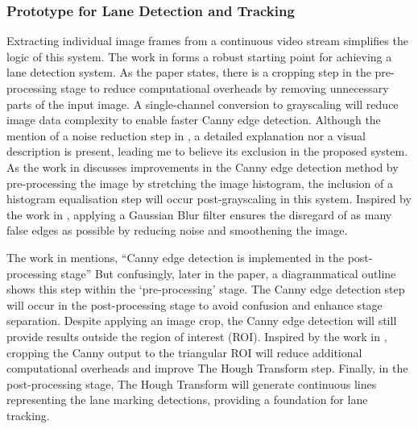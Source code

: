\documentclass[9pt,conference]{IEEEtran}
\begin{document}
\subsubsection{Prototype for Lane Detection and Tracking}

Extracting individual image frames from a continuous video stream simplifies the logic of this system. The work in \cite{b3} forms a robust starting point for achieving a lane detection system. As the paper states, there is a cropping step in the pre-processing stage to reduce computational overheads by removing unnecessary parts of the input image. A single-channel conversion to grayscaling will reduce image data complexity to enable faster Canny edge detection. Although the mention of a noise reduction step in \cite{b3}, a detailed explanation nor a visual description is present, leading me to believe its exclusion in the proposed system. As the work in \cite{b7} discusses improvements in the Canny edge detection method by pre-processing the image by stretching the image histogram, the inclusion of a histogram equalisation step will occur post-grayscaling in this system. Inspired by the work in \cite{b6}, applying a Gaussian Blur filter ensures the disregard of as many false edges as possible by reducing noise and smoothening the image.

The work in \cite{b3} mentions, ``Canny edge detection is implemented in the post-processing stage'' But confusingly, later in the paper, a diagrammatical outline shows this step within the `pre-processing' stage. The Canny edge detection step will occur in the post-processing stage to avoid confusion and enhance stage separation. Despite applying an image crop, the Canny edge detection will still provide results outside the region of interest (ROI). Inspired by the work in \cite{b6}, cropping the Canny output to the triangular ROI will reduce additional computational overheads and improve The Hough Transform step. Finally, in the post-processing stage, The Hough Transform will generate continuous lines representing the lane marking detections, providing a foundation for lane tracking.
\end{document}
